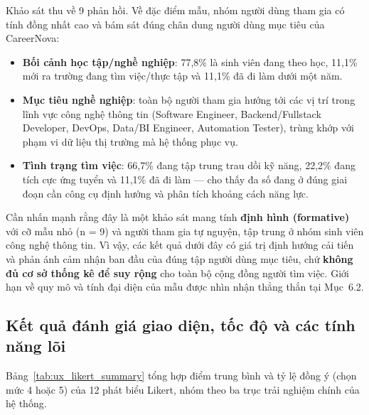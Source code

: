 Khảo sát thu về 9 phản hồi. Về đặc điểm mẫu, nhóm người dùng tham gia có tính đồng nhất cao và bám sát đúng chân dung người dùng mục tiêu của CareerNova:

\begin{itemize}
    \item \textbf{Bối cảnh học tập/nghề nghiệp}: 77,8\% là sinh viên đang theo học, 11,1\% mới ra trường đang tìm việc/thực tập và 11,1\% đã đi làm dưới một năm.
    \item \textbf{Mục tiêu nghề nghiệp}: toàn bộ người tham gia hướng tới các vị trí trong lĩnh vực công nghệ thông tin (Software Engineer, Backend/Fullstack Developer, DevOps, Data/BI Engineer, Automation Tester), trùng khớp với phạm vi dữ liệu thị trường mà hệ thống phục vụ.
    \item \textbf{Tình trạng tìm việc}: 66,7\% đang tập trung trau dồi kỹ năng, 22,2\% đang tích cực ứng tuyển và 11,1\% đã đi làm --- cho thấy đa số đang ở đúng giai đoạn cần công cụ định hướng và phân tích khoảng cách năng lực.
\end{itemize}


Cần nhấn mạnh rằng đây là một khảo sát mang tính \textbf{định hình (formative)} với cỡ mẫu nhỏ (n = 9) và người tham gia tự nguyện, tập trung ở nhóm sinh viên công nghệ thông tin. Vì vậy, các kết quả dưới đây có giá trị định hướng cải tiến và phản ánh cảm nhận ban đầu của đúng tập người dùng mục tiêu, chứ \textbf{không đủ cơ sở thống kê để suy rộng} cho toàn bộ cộng đồng người tìm việc. Giới hạn về quy mô và tính đại diện của mẫu được nhìn nhận thẳng thắn tại Mục~6.2.

\subsection{Kết quả đánh giá giao diện, tốc độ và các tính năng lõi}

Bảng~\ref{tab:ux_likert_summary} tổng hợp điểm trung bình và tỷ lệ đồng ý (chọn mức 4 hoặc 5) của 12 phát biểu Likert, nhóm theo ba trục trải nghiệm chính của hệ thống.


